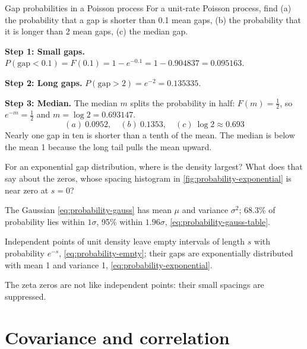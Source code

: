 \begin{sample}{Gap probabilities in a Poisson process}
For a unit-rate Poisson process, find (a) the probability that a gap is shorter than 0.1 mean gaps, (b) the probability that it is longer than 2 mean gaps, (c) the median gap.

\textbf{Step 1: Small gaps.} $P(\text{gap}<0.1)=F(0.1)=1-e^{-0.1}=1-0.904837=0.095163$.

\textbf{Step 2: Long gaps.} $P(\text{gap}>2)=e^{-2}=0.135335$.

\textbf{Step 3: Median.} The median $m$ splits the probability in half: $F(m)=\tfrac12$, so $e^{-m}=\tfrac12$ and $m=\log2=0.693147$.
\[
\boxed{(a)\ 0.0952,\quad (b)\ 0.1353,\quad (c)\ \log 2\approx0.693}
\]
Nearly one gap in ten is shorter than a tenth of the mean. The median is below the mean 1 because the long tail pulls the mean upward.
\end{sample}

\begin{checkpoint}
For an exponential gap distribution, where is the density largest? What does that say about the zeros, whose spacing histogram in \cref{fig:probability-exponential} is near zero at $s=0$?
\end{checkpoint}

\begin{keyideas}

\item The Gaussian \cref{eq:probability-gauss} has mean $\mu$ and variance $\sigma^2$; 68.3\% of probability lies within $1\sigma$, 95\% within $1.96\sigma$, \cref{eq:probability-gauss-table}.
\item Independent points of unit density leave empty intervals of length $s$ with probability $e^{-s}$, \cref{eq:probability-empty}; their gaps are exponentially distributed with mean 1 and variance 1, \cref{eq:probability-exponential}.
\item The zeta zeros are not like independent points: their small spacings are suppressed.

\end{keyideas}

\section{Covariance and correlation}\label{sec:probability-correlation}

